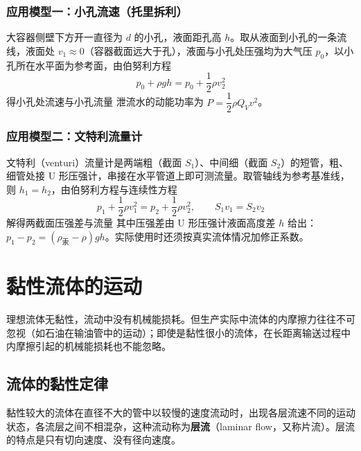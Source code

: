         \subsubsection{应用模型一：小孔流速（托里拆利）}
        大容器侧壁下方开一直径为 $d$ 的小孔，液面距孔高 $h$。取从液面到小孔的一条流线，液面处 $v_{1}\approx0$（容器截面远大于孔），液面与小孔处压强均为大气压 $p_{0}$，以小孔所在水平面为参考面，由伯努利方程
        \[
        p_{0}+\rho gh=p_{0}+\frac{1}{2}\rho v_{2}^{2}
        \]
        得小孔处流速与小孔流量
        泄流水的动能功率为 $P=\dfrac{1}{2}\rho Q_{V}v^{2}$。

        \subsubsection{应用模型二：文特利流量计}
        文特利（venturi）流量计是两端粗（截面 $S_{1}$）、中间细（截面 $S_{2}$）的短管，粗、细管处接 U 形压强计，串接在水平管道上即可测流量。取管轴线为参考基准线，则 $h_{1}=h_{2}$，由伯努利方程与连续性方程
        \[
        p_{1}+\frac{1}{2}\rho v_{1}^{2}=p_{2}+\frac{1}{2}\rho v_{2}^{2},
        \qquad S_{1}v_{1}=S_{2}v_{2}
        \]
        解得两截面压强差与流量
        其中压强差由 U 形压强计液面高度差 $h$ 给出：$p_{1}-p_{2}=(\rho_{\text{汞}}-\rho)gh$。实际使用时还须按真实流体情况加修正系数。

\section{黏性流体的运动}
    理想流体无黏性，流动中没有机械能损耗。但生产实际中流体的内摩擦力往往不可忽视（如石油在输油管中的运动）；即使是黏性很小的流体，在长距离输送过程中内摩擦引起的机械能损耗也不能忽略。

    \subsection{流体的黏性定律}
    黏性较大的流体在直径不大的管中以较慢的速度流动时，出现各层流速不同的运动状态，各流层之间不相混杂，这种流动称为\textbf{层流}（laminar flow，又称片流）。层流的特点是只有切向速度、没有径向速度。

